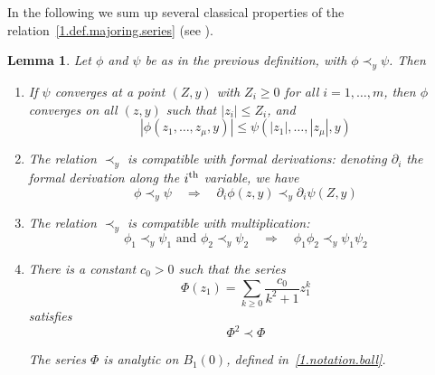 \documentclass[10pt]{amsart}
\newtheorem{lemm}[cdrthm]{Lemma}
\theoremstyle{definition}
\theoremstyle{plain}
\newcommand{\dptl}{\partial}%
\newcommand*\dsp{\displaystyle}
\begin{document}
In the following we sum up several classical properties of the relation~\eqref{1.def.majoring.series} (see \cite{cartan1995theorie}).

\begin{lemm}\label{1.majoring.properties}
Let $\phi$ and $\psi$ be as in the previous definition, with $\phi \prec_{y} \psi$. Then
\begin{enumerate}
\item If $\psi$ converges at a point $(Z,y)$ with $Z_i \geq 0$ for all $i=1,\ldots,m$, then $\phi$ converges on all $(z,y)$ such that $|z_i|\leq Z_i$, and
\begin{equation} 
|\phi(z_1,\ldots,z_{\mu},y)| \leq \psi(|z_1|,\ldots,|z_{\mu}|,y)
\end{equation}

\item The relation $\prec_{y}$ is compatible with formal derivations: denoting $\dptl_{i}$ the formal derivation along the $i^{\rm th}$ variable, we have
\begin{equation}
\phi \prec_{y} \psi \quad \Longrightarrow \quad \dptl_{i}\phi(z,y) \prec_{y} \dptl_{i}\psi(Z,y)
\end{equation}

\item The relation $\prec_{y}$ is compatible with multiplication:
\begin{equation}
\phi_1 \prec_{y} \psi_1 \text{ and } \phi_2 \prec_{y} \psi_2 \quad \Longrightarrow \quad \phi_1 \phi_2 \prec_{y} \psi_1\psi_2
\end{equation}

\item There is a constant $c_0>0$ such that the series
\begin{equation}\label{1.defi.Phi}
\Phi(z_1) = \sum_{k \geq 0} \frac{\dsp c_0}{\dsp k^2+1} z_1^{k}
\end{equation}
satisfies
\begin{equation}\label{1.Phi2}
\Phi^2 \prec \Phi
\end{equation}

The series $\Phi$ is analytic on $B_{1}(0)$, defined in~\eqref{1.notation.ball}.
\end{enumerate}
\end{lemm}
\end{document}
